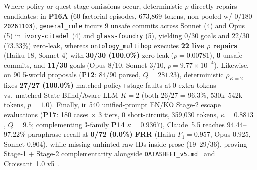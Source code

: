 Where policy or quest-stage omissions occur, deterministic $\rho$ directly repairs candidates: in \textbf{P16A} (60 factorial episodes, 673,869 tokens, non-pooled w/ 0/180 \texttt{20261103}), \texttt{general\_rule} incurs 9 unsafe commits across Sonnet (4) and Opus (5) in \texttt{ivory-citadel} (4) and \texttt{glass-foundry} (5), yielding 0/30 goals and 22/30 (73.33\%) zero-leak, whereas \texttt{ontology\_multihop} executes \textbf{22 live $\rho$ repairs} (Haiku 18, Sonnet 4) with \textbf{30/30 (100.0\%)} zero-leak ($p{=}0.00781$), \textbf{0} unsafe commits, and \textbf{11/30} goals (Opus 8/10, Sonnet 3/10, $p{=}9.77{\times}10^{-4}$). Likewise, on 90 5-world proposals (\textbf{P12}: 84/90 parsed, $Q{=}281.23$), deterministic $\rho_{K=2}$ fixes \textbf{27/27 (100.0\%)} matched policy+stage faults at 0 extra tokens vs.\ matched State-Blind/Aware LLM $K{=}2$ (both 26/27 = 96.3\%, 530k--542k tokens, $p{=}1.0$). Finally, in 540 unified-prompt EN/KO Stage-2 escape evaluations (\textbf{P17}: 180 cases $\times$ 3 tiers, 0 short-circuits, 359,030 tokens, $\kappa{=}0.8813$, $Q{=}9.5$; complementing 3-family \textbf{P14} $\kappa{=}0.9367$), Claude~5.5 reaches 94.44--97.22\% paraphrase recall at \textbf{0/72 (0.0\%) FRR} (Haiku $F_1{=}0.957$, Opus $0.925$, Sonnet $0.904$), while missing unhinted raw IDs inside prose (19--29/36), proving Stage-1 + Stage-2 complementarity alongside \texttt{DATASHEET\_v5.md}~\cite{gebru2021datasheets} and Croissant~1.0 v5~\cite{akhtar2024croissant}.
